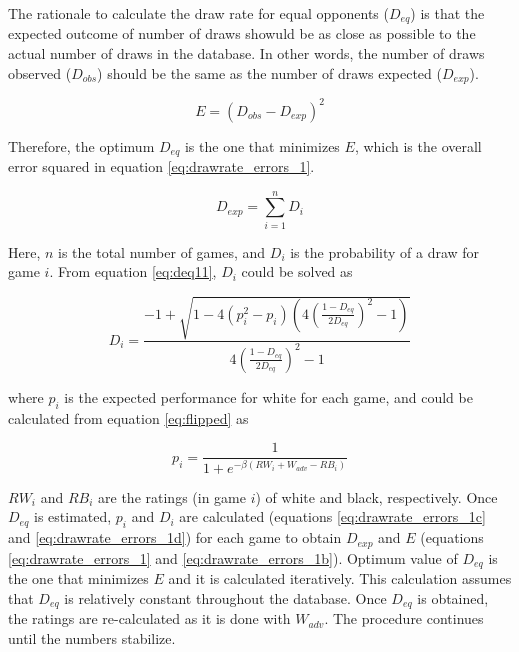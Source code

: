 \documentclass[12pt]{article}
\begin{document}
The rationale to calculate the draw rate for equal opponents ($D_{eq}$) is that the expected outcome of number of draws showuld be as close as possible to the actual number of draws in the database.
In other words, the number of draws observed ($D_{obs}$) should be the same as the number of draws expected ($D_{exp}$).

	\begin{equation} \label{eq:drawrate_errors_1}
	E = (D_{obs} - D_{exp})^2
	\end{equation}

Therefore, the optimum $D_{eq}$ is the one that minimizes $E$, which is the overall error squared in equation \ref{eq:drawrate_errors_1}.

	\begin{equation} \label{eq:drawrate_errors_1b}
	D_{exp} = \sum\limits_{i=1}^n D_{i} 
	\end{equation}

Here, $n$ is the total number of games, and $D_{i}$ is the probability of a draw for game $i$.
From equation \ref{eq:deq11}, $D_{i}$ could be solved as

	\begin{equation} \label{eq:drawrate_errors_1c}
	D_{i} = \frac{- 1 + \sqrt{ 1 - 4 (p_{i}^2-p_{i}) (4 (\frac{1-D_{eq}}{2 D_{eq}})^2 - 1) }  }{4 (\frac{1-D_{eq}}{2 D_{eq}})^2 - 1} 
	\end{equation}

where $p_{i}$ is the expected performance for white for each game, and could be calculated from equation \ref{eq:flipped} as

	\begin{equation} \label{eq:drawrate_errors_1d}
	p_{i} = \frac{1}{1 + e^{-\beta(RW_{i} + W_{adv}-RB_{i})}}
	\end{equation}

$RW_{i}$ and $RB_{i}$ are the ratings (in game $i$) of white and black, respectively.
Once $D_{eq}$ is estimated, $p_{i}$ and $D_{i}$ are calculated (equations \ref{eq:drawrate_errors_1c} and \ref{eq:drawrate_errors_1d}) for each game to obtain $D_{exp}$ and $E$ (equations \ref{eq:drawrate_errors_1} and \ref{eq:drawrate_errors_1b}).
Optimum value of $D_{eq}$ is the one that minimizes $E$ and it is calculated iteratively.
This calculation assumes that $D_{eq}$ is relatively constant throughout the database.
Once $D_{eq}$ is obtained, the ratings are re-calculated as it is done with $W_{adv}$.
The procedure continues until the numbers stabilize.
\end{document}
